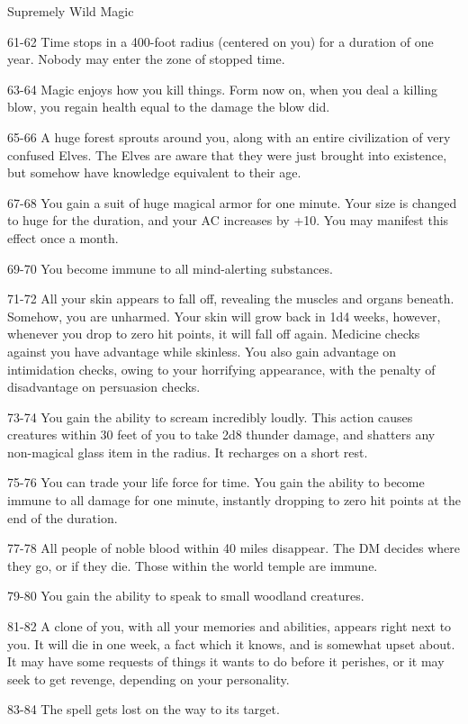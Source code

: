 \begin{rolltable}{Supremely Wild Magic}
\item[61-62] Time stops in a 400-foot radius (centered on you) for a duration of one year. Nobody may enter the zone of stopped time.
\item[63-64] Magic enjoys how you kill things.
Form now on, when you deal a killing blow, you regain health equal to the damage the blow did.
\item[65-66] A huge forest sprouts around you, along with an entire civilization of very confused Elves.
The Elves are aware that they were just brought into existence, but somehow have knowledge equivalent to their age.
\item[67-68] You gain a suit of huge magical armor for one minute. 
Your size is changed to huge for the duration, and your AC increases by +10.
You may manifest this effect once a month.
\item[69-70] You become immune to all mind-alerting substances.
\item[71-72] All your skin appears to fall off, revealing the muscles and organs beneath. 
Somehow, you are unharmed.
Your skin will grow back in 1d4 weeks, however, whenever you drop to zero hit points, it will fall off again.
Medicine checks against you have advantage while skinless.
You also gain advantage on intimidation checks, owing to your horrifying appearance, with the penalty of disadvantage on persuasion checks.
\item[73-74] You gain the ability to scream incredibly loudly.
This action causes creatures within 30 feet of you to take 2d8 thunder damage, and shatters any non-magical glass item in the radius.
It recharges on a short rest.
\item[75-76] You can trade your life force for time.
You gain the ability to become immune to all damage for one minute, instantly dropping to zero hit points at the end of the duration.
\item[77-78] All people of noble blood within 40 miles disappear.
The DM decides where they go, or if they die.
Those within the world temple are immune.
\item[79-80] You gain the ability to speak to small woodland creatures.
\item[81-82] A clone of you, with all your memories and abilities, appears right next to you.
It will die in one week, a fact which it knows, and is somewhat upset about.
It may have some requests of things it wants to do before it perishes, or it may seek to get revenge, depending on your personality.
\item[83-84] The spell gets lost on the way to its target.

\end{rolltable}
